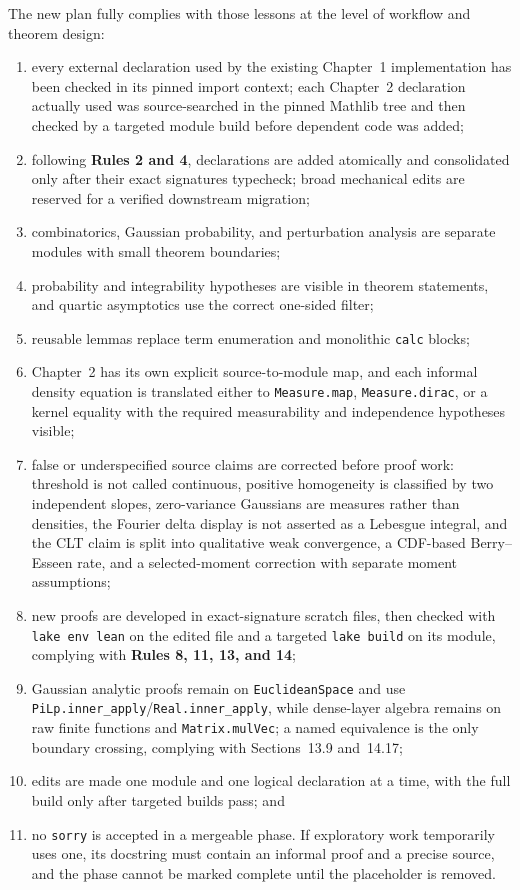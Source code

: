 The new plan fully complies with those lessons at the level of workflow and theorem design:
\begin{enumerate}
  \item every external declaration used by the existing Chapter~1 implementation has been checked
    in its pinned import context; each Chapter~2 declaration actually used was source-searched in
    the pinned Mathlib tree and then checked by a targeted module build before dependent code was
    added;
  \item following \textbf{Rules 2 and 4}, declarations are added atomically and consolidated only
    after their exact signatures typecheck; broad mechanical edits are reserved for a verified
    downstream migration;
  \item combinatorics, Gaussian probability, and perturbation analysis are separate modules with
    small theorem boundaries;
  \item probability and integrability hypotheses are visible in theorem statements, and quartic
    asymptotics use the correct one-sided filter;
  \item reusable lemmas replace term enumeration and monolithic \texttt{calc} blocks;
  \item Chapter~2 has its own explicit source-to-module map, and each informal density equation is
    translated either to \texttt{Measure.map}, \texttt{Measure.dirac}, or a kernel equality with the
    required measurability and independence hypotheses visible;
  \item false or underspecified source claims are corrected before proof work: threshold is not
    called continuous, positive homogeneity is classified by two independent slopes, zero-variance
    Gaussians are measures rather than densities, the Fourier delta display is not asserted as a
    Lebesgue integral, and the CLT claim is split into qualitative weak convergence, a CDF-based
    Berry--Esseen rate, and a selected-moment correction with separate moment assumptions;
  \item new proofs are developed in exact-signature scratch files, then checked with
    \texttt{lake env lean} on the edited file and a targeted \texttt{lake build} on its module,
    complying with \textbf{Rules 8, 11, 13, and 14};
  \item Gaussian analytic proofs remain on \texttt{EuclideanSpace} and use
    \texttt{PiLp.inner\_apply}/\texttt{Real.inner\_apply}, while dense-layer algebra remains on raw
    finite functions and \texttt{Matrix.mulVec}; a named equivalence is the only boundary crossing,
    complying with Sections~13.9 and~14.17;
  \item edits are made one module and one logical declaration at a time, with the full build only
    after targeted builds pass; and
  \item no \texttt{sorry} is accepted in a mergeable phase.  If exploratory work temporarily uses
    one, its docstring must contain an informal proof and a precise source, and the phase cannot be
    marked complete until the placeholder is removed.
\end{enumerate}

